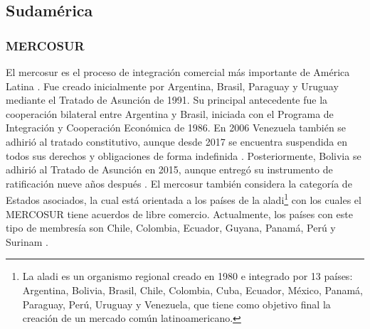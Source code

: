 \clearpage
\subsection{Sudamérica}

\subsubsection{MERCOSUR}

El \gls{mercosur} es el proceso de integración comercial más importante de América Latina \parencite[p.~195]{Lakos2025}. Fue creado inicialmente por Argentina, Brasil, Paraguay y Uruguay mediante el Tratado de Asunción de 1991. Su principal antecedente fue la cooperación bilateral entre Argentina y Brasil, iniciada con el Programa de Integración y Cooperación Económica de 1986. En 2006 Venezuela también se adhirió al tratado constitutivo, aunque desde 2017 se encuentra suspendida en todos sus derechos y obligaciones de forma indefinida \parencite[p.~769]{EuropaDirectory2022}. Posteriormente, Bolivia se adhirió al Tratado de Asunción en 2015, aunque entregó su instrumento de ratificación nueve años después \parencite[p.~199]{Lakos2025}. 
El \gls{mercosur} también considera la categoría de Estados asociados, la cual está orientada a los países de la \gls{aladi}\footnote{La \gls{aladi} es un organismo regional creado en 1980 e integrado por 13 países: Argentina, Bolivia, Brasil, Chile, Colombia, Cuba, Ecuador, México, Panamá, Paraguay, Perú, Uruguay y Venezuela, que tiene como objetivo final la creación de un mercado común latinoamericano.} con los cuales el MERCOSUR tiene acuerdos de libre comercio. Actualmente, los países con este tipo de membresía son Chile, Colombia, Ecuador, Guyana, Panamá, Perú y Surinam \parencite{MERCOSUR_Paises}.


